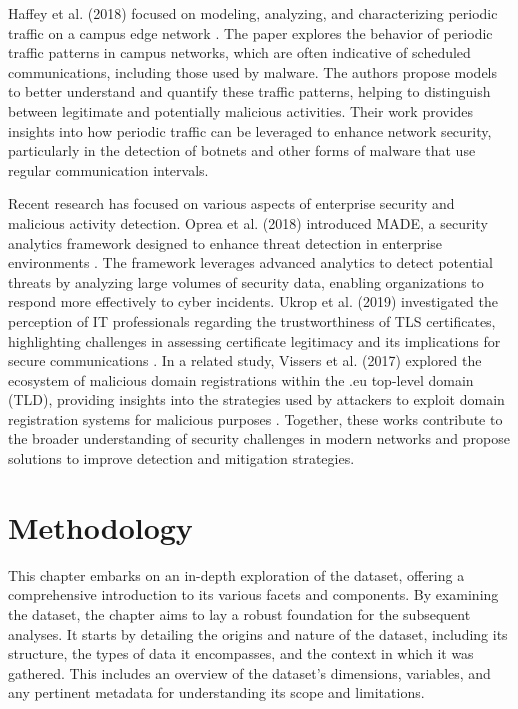 Haffey et al. (2018) focused on modeling, analyzing, and characterizing periodic traffic on a campus edge network \cite{haffey2018modeling}. The paper explores the behavior of periodic traffic patterns in campus networks, which are often indicative of scheduled communications, including those used by malware. The authors propose models to better understand and quantify these traffic patterns, helping to distinguish between legitimate and potentially malicious activities. Their work provides insights into how periodic traffic can be leveraged to enhance network security, particularly in the detection of botnets and other forms of malware that use regular communication intervals.

Recent research has focused on various aspects of enterprise security and malicious activity detection. Oprea et al. (2018) introduced MADE, a security analytics framework designed to enhance threat detection in enterprise environments \cite{oprea2018made} . The framework leverages advanced analytics to detect potential threats by analyzing large volumes of security data, enabling organizations to respond more effectively to cyber incidents. Ukrop et al. (2019) investigated the perception of IT professionals regarding the trustworthiness of TLS certificates, highlighting challenges in assessing certificate legitimacy and its implications for secure communications \cite{ukrop2019will} . In a related study, Vissers et al. (2017) explored the ecosystem of malicious domain registrations within the .eu top-level domain (TLD), providing insights into the strategies used by attackers to exploit domain registration systems for malicious purposes \cite{vissers2017exploring} . Together, these works contribute to the broader understanding of security challenges in modern networks and propose solutions to improve detection and mitigation strategies.


\chapter{Methodology}
This chapter embarks on an in-depth exploration of the dataset, offering a comprehensive introduction to its various facets and components. By examining the dataset, the chapter aims to lay a robust foundation for the subsequent analyses. It starts by detailing the origins and nature of the dataset, including its structure, the types of data it encompasses, and the context in which it was gathered. This includes an overview of the dataset's dimensions, variables, and any pertinent metadata  for understanding its scope and limitations.

